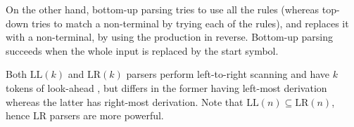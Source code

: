 On the other hand, bottom-up parsing tries to use all the rules (whereas top-down tries to match a non-terminal by trying each of the rules), and replaces it with a non-terminal, by using the production in reverse.
Bottom-up parsing succeeds when the whole input is replaced by the start symbol.

Both $\text{LL}(k)$ and $\text{LR}(k)$ parsers perform left-to-right scanning and have $k$ tokens of look-ahead \cite{dragon}, but differs in the former having left-most derivation whereas the latter has right-most derivation.
Note that $\text{LL}(n) \subseteq \text{LR}(n)$, hence $\text{LR}$ parsers are more powerful.
